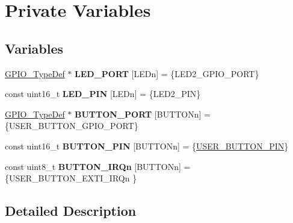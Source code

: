 \hypertarget{group___s_t_m32_f0_x_x___n_u_c_l_e_o___private___variables}{}\section{Private Variables}
\label{group___s_t_m32_f0_x_x___n_u_c_l_e_o___private___variables}
\subsection*{Variables}
\begin{DoxyCompactItemize}
\item 
\mbox{\label{group___s_t_m32_f0_x_x___n_u_c_l_e_o___private___variables_ga1127c0cf12e4ec7a66f2a64cd7407218}} 
\hyperlink{struct_g_p_i_o___type_def}{G\+P\+I\+O\+\_\+\+Type\+Def} $\ast$ {\bfseries L\+E\+D\+\_\+\+P\+O\+RT} \mbox{[}L\+E\+Dn\mbox{]} = \{L\+E\+D2\+\_\+\+G\+P\+I\+O\+\_\+\+P\+O\+RT\}
\item 
\mbox{\label{group___s_t_m32_f0_x_x___n_u_c_l_e_o___private___variables_ga51722a2d3aff3970f123a94ac62b908f}} 
const uint16\+\_\+t {\bfseries L\+E\+D\+\_\+\+P\+IN} \mbox{[}L\+E\+Dn\mbox{]} = \{L\+E\+D2\+\_\+\+P\+IN\}
\item 
\mbox{\label{group___s_t_m32_f0_x_x___n_u_c_l_e_o___private___variables_gad63ed42b4071e78f80f7462227da4f35}} 
\hyperlink{struct_g_p_i_o___type_def}{G\+P\+I\+O\+\_\+\+Type\+Def} $\ast$ {\bfseries B\+U\+T\+T\+O\+N\+\_\+\+P\+O\+RT} \mbox{[}B\+U\+T\+T\+O\+Nn\mbox{]} = \{U\+S\+E\+R\+\_\+\+B\+U\+T\+T\+O\+N\+\_\+\+G\+P\+I\+O\+\_\+\+P\+O\+RT\}
\item 
\mbox{\label{group___s_t_m32_f0_x_x___n_u_c_l_e_o___private___variables_gadf78f2d71408a01f8d30929c2d2da82b}} 
const uint16\+\_\+t {\bfseries B\+U\+T\+T\+O\+N\+\_\+\+P\+IN} \mbox{[}B\+U\+T\+T\+O\+Nn\mbox{]} = \{\hyperlink{group___s_t_m32_f0_x_x___n_u_c_l_e_o___b_u_t_t_o_n_ga34df6915e3013d6a0c74131d3946b659}{U\+S\+E\+R\+\_\+\+B\+U\+T\+T\+O\+N\+\_\+\+P\+IN}\}
\item 
\mbox{\label{group___s_t_m32_f0_x_x___n_u_c_l_e_o___private___variables_ga13c3e27c584df9fccc4697dd535ea1cd}} 
const uint8\+\_\+t {\bfseries B\+U\+T\+T\+O\+N\+\_\+\+I\+R\+Qn} \mbox{[}B\+U\+T\+T\+O\+Nn\mbox{]} = \{U\+S\+E\+R\+\_\+\+B\+U\+T\+T\+O\+N\+\_\+\+E\+X\+T\+I\+\_\+\+I\+R\+Qn \}
\end{DoxyCompactItemize}


\subsection{Detailed Description}
